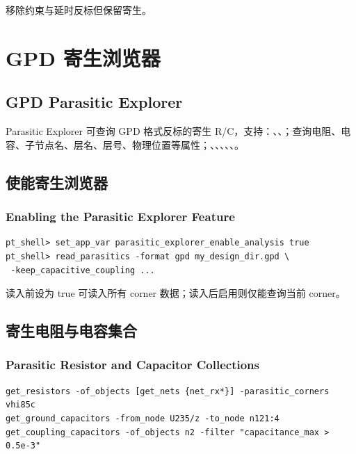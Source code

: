  移除约束与延时反标但保留寄生。

\section{GPD 寄生浏览器}
\subsection*{GPD Parasitic Explorer}

Parasitic Explorer 可查询 GPD 格式反标的寄生 R/C，支持：、、；查询电阻、电容、子节点名、层名、层号、物理位置等属性；、、、、、。

\subsection{使能寄生浏览器}
\subsubsection*{Enabling the Parasitic Explorer Feature}

\begin{lstlisting}
pt_shell> set_app_var parasitic_explorer_enable_analysis true
pt_shell> read_parasitics -format gpd my_design_dir.gpd \
 -keep_capacitive_coupling ...
\end{lstlisting}

读入前设为 true 可读入所有 corner 数据；读入后启用则仅能查询当前 corner。

\subsection{寄生电阻与电容集合}
\subsubsection*{Parasitic Resistor and Capacitor Collections}

\begin{lstlisting}
get_resistors -of_objects [get_nets {net_rx*}] -parasitic_corners vhi85c
get_ground_capacitors -from_node U235/z -to_node n121:4
get_coupling_capacitors -of_objects n2 -filter "capacitance_max > 0.5e-3"
\end{lstlisting}

